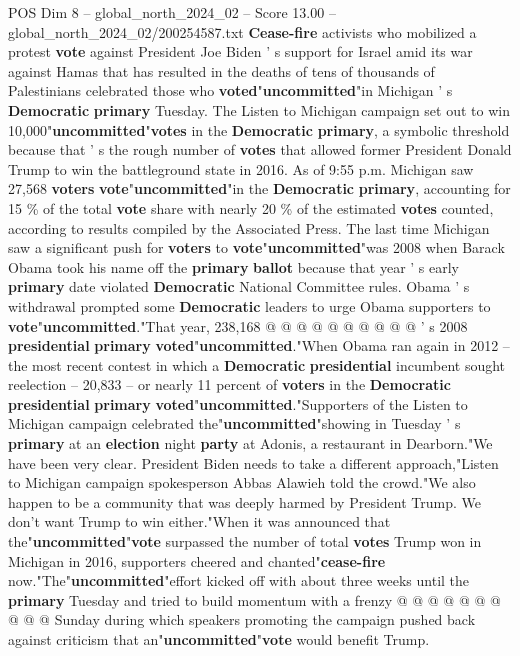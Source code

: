 \begin{textsample}{POS Dim 8 – global\_north\_2024\_02 – Score 13.00 – global\_north\_2024\_02/200254587.txt}  \label{ex:f8_pos_030}
\textbf{Cease-fire} activists who mobilized a protest \textbf{vote} against President Joe Biden ' s support for Israel amid its war against Hamas that has resulted in the deaths of tens of thousands of Palestinians celebrated those who \textbf{voted}"\textbf{uncommitted}"in Michigan ' s \textbf{Democratic} \textbf{primary} Tuesday.
The Listen to Michigan campaign set out to win 10,000"\textbf{uncommitted}"\textbf{votes} in the \textbf{Democratic} \textbf{primary}, a symbolic threshold because that ' s the rough number of \textbf{votes} that allowed former President Donald Trump to win the battleground state in 2016.
As of 9:55 p.m.
Michigan saw 27,568 \textbf{voters} \textbf{vote}"\textbf{uncommitted}"in the \textbf{Democratic} \textbf{primary}, accounting for 15 \% of the total \textbf{vote} share with nearly 20 \% of the estimated \textbf{votes} counted, according to results compiled by the Associated Press.
The last time Michigan saw a significant push for \textbf{voters} to \textbf{vote}"\textbf{uncommitted}"was 2008 when Barack Obama took his name off the \textbf{primary} \textbf{ballot} because that year ' s early \textbf{primary} date violated \textbf{Democratic} National Committee rules.
Obama ' s withdrawal prompted some \textbf{Democratic} leaders to urge Obama supporters to \textbf{vote}"\textbf{uncommitted}."That year, 238,168 @ @ @ @ @ @ @ @ @ @ ' s 2008 \textbf{presidential} \textbf{primary} \textbf{voted}"\textbf{uncommitted}."When Obama ran again in 2012 -- the most recent contest in which a \textbf{Democratic} \textbf{presidential} incumbent sought reelection -- 20,833 -- or nearly 11 percent of \textbf{voters} in the \textbf{Democratic} \textbf{presidential} \textbf{primary} \textbf{voted}"\textbf{uncommitted}."Supporters of the Listen to Michigan campaign celebrated the"\textbf{uncommitted}"showing in Tuesday ' s \textbf{primary} at an \textbf{election} night \textbf{party} at Adonis, a restaurant in Dearborn."We have been very clear.
President Biden needs to take a different approach,"Listen to Michigan campaign spokesperson Abbas Alawieh told the crowd."We also happen to be a community that was deeply harmed by President Trump.
We don't want Trump to win either."When it was announced that the"\textbf{uncommitted}"\textbf{vote} surpassed the number of total \textbf{votes} Trump won in Michigan in 2016, supporters cheered and chanted"\textbf{cease-fire} now."The"\textbf{uncommitted}"effort kicked off with about three weeks until the \textbf{primary} Tuesday and tried to build momentum with a frenzy @ @ @ @ @ @ @ @ @ @ Sunday during which speakers promoting the campaign pushed back against criticism that an"\textbf{uncommitted}"\textbf{vote} would benefit Trump.

\end{textsample}
